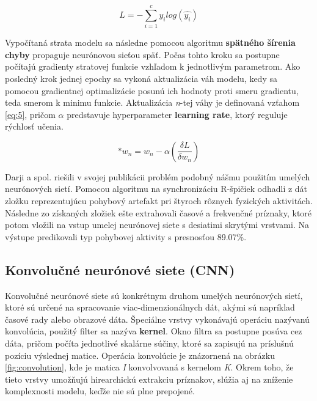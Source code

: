 \begin{equation} 
    \label{eq:4}
    L = -\sum_{i=1}^{c} y_i log(\hat{y_i})
\end{equation}

Vypočítaná strata modelu sa následne pomocou algoritmu \textbf{spätného šírenia chyby} propaguje neurónovou sieťou späť. Počas tohto kroku sa postupne počítajú gradienty stratovej funkcie vzhľadom k jednotlivým parametrom. Ako posledný krok jednej epochy sa vykoná aktualizácia váh modelu, kedy sa pomocou gradientnej optimalizácie posunú ich hodnoty proti smeru gradientu, teda smerom k minimu funkcie.\cite{Zou2008}\cite{yegnanarayana2009artificial}\cite{mehrotra1997elements} Aktualizácia \textit{n}-tej váhy je definovaná vzťahom \ref{eq:5}, pričom \textit{\( \alpha \)} predstavuje hyperparameter \textbf{learning rate}, ktorý reguluje rýchlosť učenia. 

\begin{equation} 
    \label{eq:5}
    *w_n = w_n - \alpha(\frac{\delta L}{\delta w_n})
\end{equation}

Darji a spol.\cite{Darji2013} riešili v svojej publikácii problém podobný nášmu použitím umelých neurónových sietí. Pomocou algoritmu na synchronizáciu R-špičiek odhadli z dát zložku reprezentujúcu pohybový artefakt pri štyroch rôznych fyzických aktivitách. Následne zo získaných zložiek ešte extrahovali časové a frekvenčné príznaky, ktoré potom vložili na vstup umelej neurónovej siete s desiatimi skrytými vrstvami. Na výstupe predikovali typ pohybovej aktivity s presnosťou 89.07\%.

\subsection{Konvolučné neurónové siete (CNN)}

Konvolučné neurónové siete sú konkrétnym druhom umelých neurónových sietí, ktoré sú určené na spracovanie viac-dimenzionálnych dát, akými sú napríklad časové rady alebo obrazové dáta. Špeciálne vrstvy vykonávajú operáciu nazývanú konvolúcia, použitý filter sa nazýva \textbf{kernel}. Okno filtra sa postupne posúva cez dáta, pričom počíta jednotlivé skalárne súčiny, ktoré sa zapisujú na príslušnú pozíciu výslednej matice. Operácia konvolúcie je znázornená na obrázku \ref{fig:convolution}, kde je matica \textit{I} konvolvovaná s kernelom \textit{K}. Okrem toho, že tieto vrstvy umožňujú hirearchickú extrakciu príznakov, slúžia aj na zníženie komplexnosti modelu, keďže nie sú plne prepojené.

